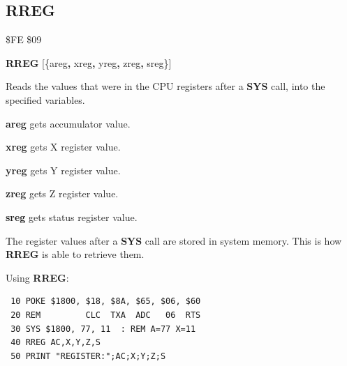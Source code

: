 \subsection{RREG}
\begin{description}[leftmargin=2cm,style=nextline]
\item [Token:] \$FE \$09
\item [Format:] {\bf RREG} [\{areg{\bf,} xreg{\bf,} yreg{\bf,} zreg{\bf,} sreg\}]
\item [Usage:] Reads the values that were in the CPU registers
               after a {\bf SYS} call, into the specified variables.

               {\bf areg} gets accumulator value.

               {\bf xreg} gets X register value.

               {\bf yreg} gets Y register value.

               {\bf zreg} gets Z register value.

               {\bf sreg} gets status register value.

\item [Remarks:] The register values after a {\bf SYS} call are stored
                 in system memory. This is how
                 {\bf RREG} is able to retrieve them.

\item [Example:] Using {\bf RREG}:
\begin{tcolorbox}[colback=black,coltext=white]
\verbatimfont{\codefont}
\begin{verbatim}
 10 POKE $1800, $18, $8A, $65, $06, $60
 20 REM         CLC  TXA  ADC   06  RTS
 30 SYS $1800, 77, 11  : REM A=77 X=11
 40 RREG AC,X,Y,Z,S
 50 PRINT "REGISTER:";AC;X;Y;Z;S
\end{verbatim}
\end{tcolorbox}
\end{description}


\newpage
